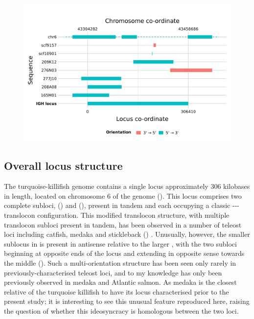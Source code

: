 \begin{figure}
\centering
\includegraphics[width=\textwidth]{_Figures/png/nfu-locus-aln}
\label{fig:nfu-locus-aln}
\end{figure}


\subsection{Overall locus structure}
\label{sec:nfu-locus-structure}
	
The turquoise-killifish genome contains a single \igh{} locus approximately 306 kilobases in length, located on chromosome 6 of the \Nfu genome (). This locus comprises two complete subloci,  () and  (), present in tandem and each occupying a classic {\vh-\dh-\jh-\ch} translocon configuration. This modified translocon structure, with multiple translocon subloci present in tandem, has been observed in a number of teleost \igh{} loci including catfish, medaka and stickleback () \parencite{fillatreau2013astonishing}. Unusually, however, the smaller  sublocus in \nfu \igh{} is present in antisense relative to the larger , with the two subloci beginning at opposite ends of the locus and extending in opposite sense towards the middle (). Such a multi-orientation structure has been seen only rarely in previously-characterised teleost \igh{} loci, and to my knowledge has only been previously observed in medaka \parencite{magadan2011medaka} and Atlantic salmon. As medaka is the closest relative of the turquoise killifish to have its locus characterised prior to the present study; it is interesting to see this unusual feature reproduced here, raising the question of whether this ideosyncracy is homologous between the two loci.
	
